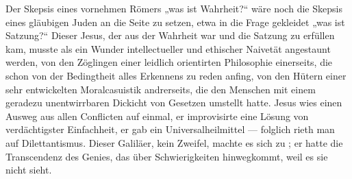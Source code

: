 Der Skepsis eines vornehmen Römers „was ist Wahrheit?“ wäre noch die Skepsis eines gläubigen Juden an die Seite zu setzen, etwa in die Frage gekleidet „was ist Satzung?“ Dieser Jesus, der aus der Wahrheit war und die Satzung zu erfüllen kam, musste als ein Wunder intellectueller und ethischer Naivetät angestaunt werden, von den Zöglingen einer leidlich orientirten Philosophie einerseits, die schon von der Bedingtheit alles Erkennens zu reden anfing, von den Hütern einer sehr entwickelten Moralcasuistik andrerseits, die den Menschen mit einem geradezu unentwirrbaren Dickicht von Gesetzen umstellt hatte. Jesus wies einen Ausweg aus allen Conflicten auf einmal, er improvisirte eine Lösung von verdächtigster Einfachheit, er gab ein Universalheilmittel — folglich rieth man auf Dilettantismus. Dieser Galiläer, kein Zweifel, machte es sich zu ; er hatte die Transcendenz des Genies, das über Schwierigkeiten hinwegkommt, weil es sie nicht sieht.
\par

